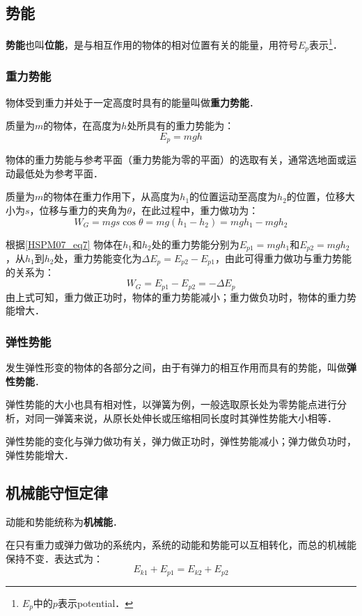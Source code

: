 \subsection{势能}

\textbf{势能}也叫\textbf{位能}，是与相互作用的物体的相对位置有关的能量，用符号$E_p$表示\footnote{$E_p$中的$p$表示potential．}．

\subsubsection{重力势能}

物体受到重力并处于一定高度时具有的能量叫做\textbf{重力势能}．

质量为$m$的物体，在高度为$h$处所具有的重力势能为：
\begin{equation}\label{HSPM07_eq7}
E_p=mgh
\end{equation}

物体的重力势能与参考平面（重力势能为零的平面）的选取有关，通常选地面或运动最低处为参考平面．

质量为$m$的物体在重力作用下，从高度为$h_1$的位置运动至高度为$h_2$的位置，位移大小为$s$，位移与重力的夹角为$\theta$，在此过程中，重力做功为：
\begin{equation}
W_G=mgs\cos \theta=mg(h_1-h_2)=mgh_1-mgh_2
\end{equation}

根据\autoref{HSPM07_eq7} 物体在$h_1$和$h_2$处的重力势能分别为$E_{p1}=mgh_1$和$E_{p2}=mgh_2$，从$h_1$到$h_2$处，重力势能变化为$\Delta E_p= E_{p2}-E_{p1}$，由此可得重力做功与重力势能的关系为：
\begin{equation}
W_G=E_{p1}-E_{p2}=-\Delta E_p
\end{equation}
由上式可知，重力做正功时，物体的重力势能减小；重力做负功时，物体的重力势能增大．

\subsubsection{弹性势能}

发生弹性形变的物体的各部分之间，由于有弹力的相互作用而具有的势能，叫做\textbf{弹性势能}．

弹性势能的大小也具有相对性，以弹簧为例，一般选取原长处为零势能点进行分析，对同一弹簧来说，从原长处伸长或压缩相同长度时其弹性势能大小相等．

弹性势能的变化与弹力做功有关，弹力做正功时，弹性势能减小；弹力做负功时，弹性势能增大．

\subsection{机械能守恒定律}

动能和势能统称为\textbf{机械能}．

在只有重力或弹力做功的系统内，系统的动能和势能可以互相转化，而总的机械能保持不变．表达式为：
\begin{equation}
E_{k1}+E_{p1}=E_{k2}+E_{p2}
\end{equation}


